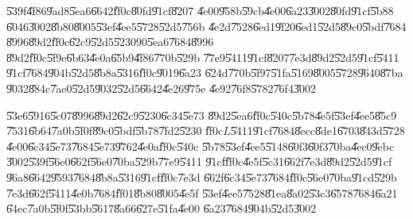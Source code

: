 \U{539f}\U{4f86}\U{9ad8}\U{5ea6}\U{6642}\U{ff0c}\U{80fd}\U{91cf}\U{8207}%
\U{4e00}\U{958b}\U{59cb}\U{4e00}\U{6a23}\U{3002}\U{80fd}\U{91cf}\U{5b88}%
\U{6046}\U{3002}\U{8b80}\U{8005}\U{53ef}\U{4ee5}\U{5728}\U{52d5}\U{756b}%
\U{4e2d}\U{7528}\U{6ed1}\U{9f20}\U{6ed1}\U{52d5}\U{89c0}\U{5bdf}\U{7684}%
\U{8996}\U{89d2}\U{ff0c}\U{62c9}\U{52d5}\U{5230}$90$\U{5ea6}\U{7684}\U{8996}%
\U{89d2}\U{ff0c}\U{5f9e}\U{6b63}\U{4e0a}\U{65b9}\U{4f86}\U{770b}\U{529b}%
\U{77e9}\U{5411}\U{91cf}\U{8207}\U{7e3d}\U{89d2}\U{52d5}\U{91cf}\U{5411}%
\U{91cf}\U{7684}\U{904b}\U{52d5}\U{8b8a}\U{5316}\U{ff0c}\U{9019}\U{6a23}%
\U{624d}\U{770b}\U{5f97}\U{51fa}\U{5169}\U{8005}\U{5728}\U{9640}\U{87ba}%
\U{9032}\U{884c}\U{7ae0}\U{52d5}\U{9032}\U{52d5}\U{6642}\U{4e26}\U{975e}%
\U{4e92}\U{76f8}\U{5782}\U{76f4}\U{3002}

\bigskip

\U{53e6}\U{5916}\U{5c07}\U{8996}\U{89d2}\U{62c9}\U{5230}\U{6c34}\U{5e73}%
\U{89d2}\U{5ea6}\U{ff0c}\U{540c}\U{5b78}\U{4e5f}\U{53ef}\U{4ee5}\U{85c9}%
\U{7531}\U{6b64}\U{7a0b}\U{5f0f}\U{89c0}\U{5bdf}\U{5b78}\U{7fd2}\U{5230}%
\U{ff0c}$L$\U{5411}\U{91cf}\U{7684}\U{8ecc}\U{8de1}\U{6703}\U{843d}\U{5728}%
\U{4e00}\U{6c34}\U{5e73}\U{7684}\U{5e73}\U{9762}\U{4e0a}\U{ff0c}\U{540c}%
\U{5b78}\U{53ef}\U{4ee5}\U{5148}\U{60f3}\U{60f3}\U{70ba}\U{4ec0}\U{9ebc}%
\U{3002}\U{539f}\U{56e0}\U{662f}\U{56e0}\U{70ba}\U{529b}\U{77e9}\U{5411}%
\U{91cf}\U{ff0c}\U{4e5f}\U{5c31}\U{662f}\U{7e3d}\U{89d2}\U{52d5}\U{91cf}%
\U{96a8}\U{6642}\U{9593}\U{7684}\U{8b8a}\U{5316}\U{91cf}\U{ff0c}\U{7e3d}%
\U{662f}\U{6c34}\U{5e73}\U{7684}\U{ff0c}\U{56e0}\U{70ba}\U{91cd}\U{529b}%
\U{7e3d}\U{662f}\U{5411}\U{4e0b}\U{7684}\U{ff01}\U{8b80}\U{8005}\U{4e5f}%
\U{53ef}\U{4ee5}\U{7528}\U{81ea}\U{8a02}\U{53c3}\U{6578}\U{7684}\U{6a21}%
\U{64ec}\U{7a0b}\U{5f0f}\U{53bb}\U{5617}\U{8a66}\U{627e}\U{51fa}\U{4e00}%
\U{6a23}\U{7684}\U{904b}\U{52d5}\U{3002}

